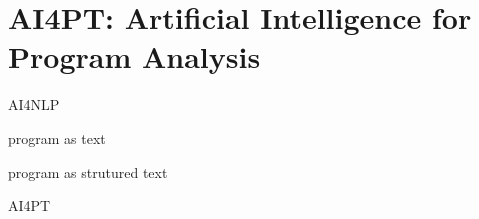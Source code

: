 \section{AI4PT: Artificial Intelligence for Program Analysis}

AI4NLP

program as text

program as strutured text

AI4PT
